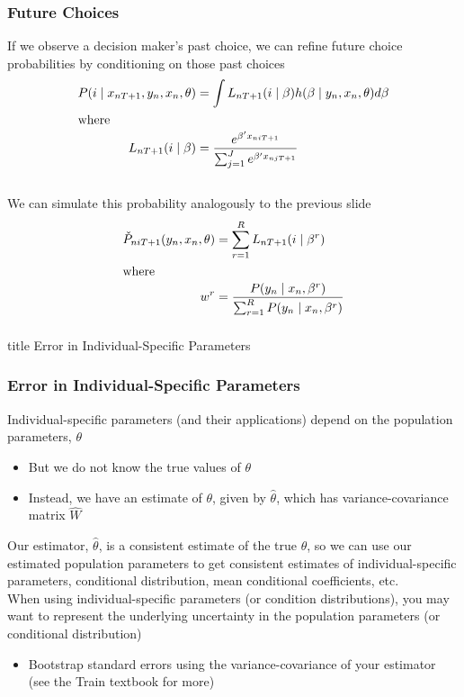 \documentclass{beamer}
\begin{document}
\begin{frame}\frametitle{Future Choices}
    If we observe a decision maker's past choice, we can refine future choice probabilities by conditioning on those past choices
    \begin{align*}
    	P(i \mid x_{nT+1}, y_n, x_n, \theta) &= \int L_{nT+1} (i \mid \beta) h(\beta \mid y_n, x_n, \theta) d \beta \\
    	\intertext{where}
    	L_{nT+1} (i \mid \beta) &= \frac{e^{\beta' x_{niT+1}}}{\sum_{j = 1}^J e^{\beta' x_{njT+1}}}
    \end{align*} \\
    \vspace{2ex}
    We can simulate this probability analogously to the previous slide
    \begin{align*}
    	\check{P}_{niT+1}(y_n, x_n, \theta) &= \sum_{r = 1}^R L_{nT+1}(i \mid \beta^r)\\
    	\intertext{where}
    	w^r &= \frac{P(y_n \mid x_n, \beta^r)}{\sum_{r = 1}^R P(y_n \mid x_n, \beta^r)}
    \end{align*}
\end{frame}

\begin{frame}\frametitle{}
    \vfill
    \centering
    \begin{beamercolorbox}[center]{title}
        \Large Error in Individual-Specific Parameters
    \end{beamercolorbox}
    \vfill
\end{frame}

\begin{frame}\frametitle{Error in Individual-Specific Parameters}
    Individual-specific parameters (and their applications) depend on the population parameters, $\theta$
    \begin{itemize}
    	\item But we do not know the true values of $\theta$
    	\item Instead, we have an estimate of $\theta$, given by $\hat{\theta}$, which has variance-covariance matrix $\hat{W}$
    \end{itemize}
    \vspace{2ex}
    Our estimator, $\hat{\theta}$, is a consistent estimate of the true $\theta$, so we can use our estimated population parameters to get consistent estimates of individual-specific parameters, conditional distribution, mean conditional coefficients, etc. \\
    \vspace{2ex}
    When using individual-specific parameters (or condition distributions), you may want to represent the underlying uncertainty in the population parameters (or conditional distribution)
    \begin{itemize}
    	\item Bootstrap standard errors using the variance-covariance of your estimator (see the Train textbook for more)
    \end{itemize}
\end{frame}
\end{document}
